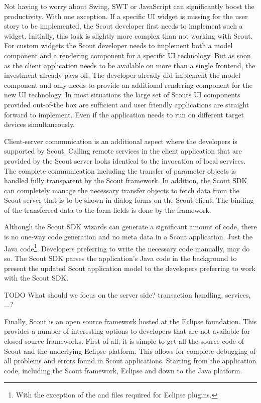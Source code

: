 \documentclass[a4paper,10pt,twoside]{book}
\begin{document}
Not having to worry about Swing, SWT or JavaScript can significantly boost the productivity.
With one exception. 
If a specific UI widget is missing for the user story to be implemented, the Scout developer first needs to implement such a widget. 
Initially, this task is slightly more complex than not working with Scout. 
For custom widgets the Scout developer needs to implement both a model component and a rendering component for a specific UI technology. 
But as soon as the client application needs to be available on more than a single frontend, the investment already pays off.
The developer already did implement the model component and only needs to provide an additional rendering component for the new UI technology.
In most situations the large set of Scouts UI components provided out-of-the box are sufficient and user friendly applications are straight forward to implement. 
Even if the application needs to run on different target devices simultaneously.

Client-server communication is an additional aspect where the developers is supported by Scout.
Calling remote services in the client application that are provided by the Scout server looks identical to the invocation of local services. 
The complete communication including the transfer of parameter objects is handled fully transparent by the Scout framework.
In addition, the Scout SDK can completely manage the necessary transfer objects to fetch data from the Scout server that is to be shown in dialog forms on the Scout client.
The binding of the transferred data to the form fields is done by the framework.

Although the Scout SDK wizards can generate a significant amount of code, there is no one-way code generation and no meta data in a Scout application.
Just the Java code\footnote{
With the exception of the  and  files required for Eclipse plugins.
}. 
Developers preferring to write the necessary code manually, may do so. 
The Scout SDK parses the application's Java code in the background to present the updated Scout application model to the developers preferring to work with the Scout SDK. 

TODO What should we focus on the server side? transaction handling, services, ...? 

Finally, Scout is an open source framework hosted at the Eclipse foundation. 
This provides a number of interesting options to developers that are not available for closed source frameworks. 
First of all, it is simple to get all the source code of Scout and the underlying Eclipse platform. 
This allows for complete debugging of all problems and errors found in Scout applications. 
Starting from the application code, including the Scout framework, Eclipse and down to the Java platform. 
\end{document}

